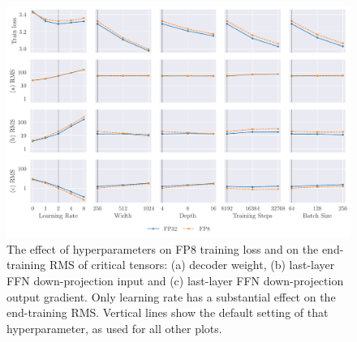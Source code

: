 \begin{figure}[h]
    \centering
    \includegraphics[width=\textwidth]{arXiv/figures/rms_scaling.pdf}
    \caption{The effect of hyperparameters on FP8 training loss and on the end-training RMS of critical tensors: (a) decoder weight, (b) last-layer FFN down-projection input and (c) last-layer FFN down-projection output gradient. Only learning rate has a substantial effect on the end-training RMS. Vertical lines show the default setting of that hyperparameter, as used for all other plots.}
    \label{fig:numerics:scale_scaling}
\end{figure}




